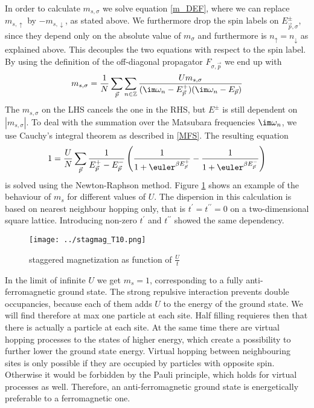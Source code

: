 \documentclass[a4paper,12pt]{report}
\begin{document}
In order to calculate $m_ {s,\sigma}$ we solve equation \ref{m_DEF}, where we can replace $m_{s,\uparrow}$ by $-m_{s,\downarrow}$, as stated above.
We furthermore drop the spin labels on $E_{\vec p,\sigma}^{\pm}$, 
since they depend only on the absolute value of $m_{\sigma}$ and furthermore is $n_{\uparrow} = n_{\downarrow}$ as explained above.
This decouples the two equations with respect to the spin label.
By using the definition of the off-diagonal propagator $F_{\sigma,\vec{p}}$ we end up with
\begin{equation}
 m_{s,\sigma} = \frac1N \sum_{\vec{p}} \sum_{n\in \mathbb{Z}} 
							      \frac { Um_{s,\sigma} }
								    { (\im \omega_n - E_{\vec{p}}^+) (\im \omega_n - E_{\vec{p}})}
\end{equation}
The $m_{s,\sigma}$ on the LHS cancels the one in the RHS, but $E^{\pm}$ is still dependent on $|m_{s,\sigma}|$.
To deal with the summation over the Matsubara frequencies $\im \omega_n$, we use Cauchy's integral theorem as described in \ref{MFS}.
The resulting equation
\begin{equation}
 1= \frac{U}{N}\sum_{\vec{p}} \frac{1}{E_{\vec p}^+ - E_{\vec{p}}^-} \left( \frac{1}{1+\euler^{\beta E_{\vec p}^+}} - \frac{1}{1+\euler^{\beta E_{\vec p}^-}} \right)
\end{equation}
is solved using the Newton-Raphson method.
Figure \ref{ms_nn} shows an example of the behaviour of $m_s$ for different values of $U$. The dispersion in this calculation is based 
on nearest neighbour hopping only, that is $t^{\prime} = t^{\prime \prime} = 0$ on a two-dimensional square lattice.
Introducing non-zero $t^{\prime}$ and $t^{\prime \prime}$ showed the same dependency. 
%
%
\begin{figure}
 \texttt{[image: ../stagmag\_T10.png]}
 \caption{staggered magnetization as function of $\frac Ut$}
 \label{ms_nn} 
\end{figure}
%
In the limit of infinite $U$ we get $m_s=1$, corresponding to a fully anti-ferromagnetic ground state. 
The strong repulsive interaction prevents double occupancies, because each of them adds $U$ to the energy of the ground state.
We will find therefore at max one particle at each site. Half filling requieres then that there is actually a particle at each site. 
At the same time there are virtual hopping processes to the states of higher energy, which create  a possibility to further lower the ground state energy.
Virtual hopping between neighbouring sites is only possible if they are occupied by particles with opposite spin.
Otherwise it would be forbidden by the Pauli principle, which holds for virtual processes as well. 
Therefore, an anti-ferromagnetic ground state is energetically preferable to a ferromagnetic one.
\end{document}
